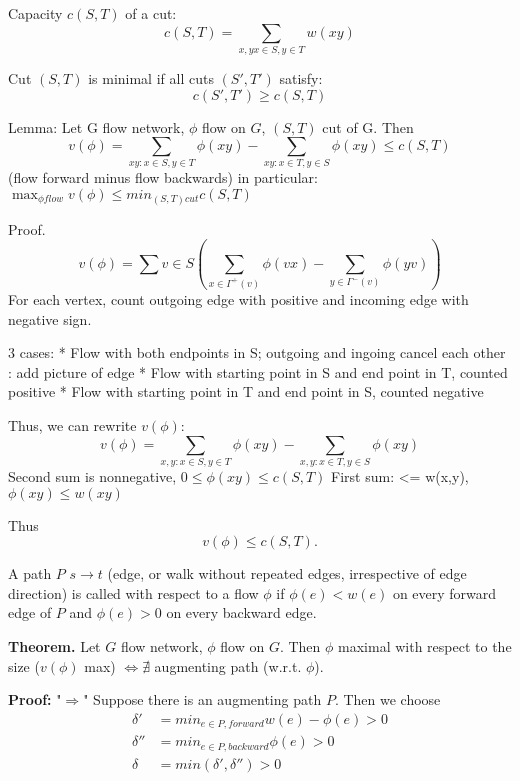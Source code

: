 Capacity $c(S,T)$ of a cut:
\[ c(S,T) = \sum_{x,y x\in S, y\in T} w(xy) \]

Cut $(S,T)$ is minimal if all cuts $(S',T')$ satisfy:
\[ c(S', T') \geq c(S,T) \]


Lemma: Let G flow network, $\phi$ flow on $G$, $(S,T)$ cut of G. Then
\[
v(\phi) = \sum_{xy: x\in S, y\in T} \phi(xy)
        - \sum_{xy: x\in T, y\in S} \phi(xy)
\leq c(S,T)
\]
(flow forward minus flow backwards)
in particular: $\max_{\phi flow} v(\phi)\leq min_{(S,T) cut} c(S,T)$

Proof.
\[
    v(\phi) = \sum{v\in S} (
        \sum_{x\in \Gamma^+(v)} \phi(vx)
      - \sum_{y\in \Gamma^-(v)} \phi(yv)
    )
\]
For each vertex, count outgoing edge with positive and incoming edge with negative sign.

3 cases:
* Flow with both endpoints in S; outgoing and ingoing cancel each other
    \TODO: add picture of edge
* Flow with starting point in S and end point in T, counted positive
* Flow with starting point in T and end point in S, counted negative

Thus, we can rewrite $v(\phi)$:
\[
    v(\phi) = \sum_{x,y: x\in S, y\in T} \phi(xy)
            - \sum_{x,y: x\in T, y\in S} \phi(xy)
\]
Second sum is nonnegative, $0 \leq \phi (xy) \leq c(S,T)$
First sum: <= w(x,y), $\phi (xy) \leq w(xy)$

Thus
\[
    v(\phi) \leq c(S,T).
\]



\begin{definition}
A path $P$ $s\rightarrow t$ (edge, or walk without repeated edges, irrespective of edge direction) is called  with respect to a flow $\phi$ if $\phi(e) < w(e)$ on every forward edge of $P$ and $\phi(e) > 0$ on every backward edge.
\end{definition}

\textbf{Theorem.}
Let $G$ flow network, $\phi$ flow on $G$. Then $\phi$ maximal with respect to the size ($v(\phi)$ max) $\Leftrightarrow \nexists$ augmenting path (w.r.t. $\phi$).

\textbf{Proof:}
"$\Rightarrow$"
Suppose there is an augmenting path $P$. Then we choose
\begin{align*}
    \delta' &= min_{e \in P, forward} w(e) - \phi(e) > 0 \\
    \delta'' &= min_{e\in P, backward} \phi(e) > 0 \\
    \delta &= min(\delta', \delta'') > 0
\end{align*}

